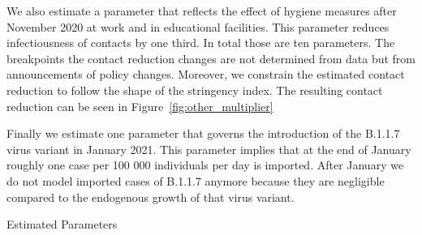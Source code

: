 We also estimate a parameter that reflects the effect of hygiene measures after November
2020 at work and in educational facilities. This parameter reduces infectiousness of
contacts by one third. In total those are ten parameters. The breakpoints the contact
reduction changes are not determined from data but from announcements of policy changes.
Moreover, we constrain the estimated contact reduction to follow the shape of the
stringency index. The resulting contact reduction can be seen in
Figure~\ref{fig:other_multiplier}


Finally we estimate one parameter that governs the introduction of the B.1.1.7 virus
variant in January 2021. This parameter implies that at the end of January roughly one
case per 100 000 individuals per day is imported. After January we do not model imported
cases of B.1.1.7 anymore because they are negligible compared to the endogenous growth
of that virus variant.

\begin{table}[htb]
    \centering
    \caption{Estimated Parameters}
    \label{tab:estimated_params}
    
\end{table}
